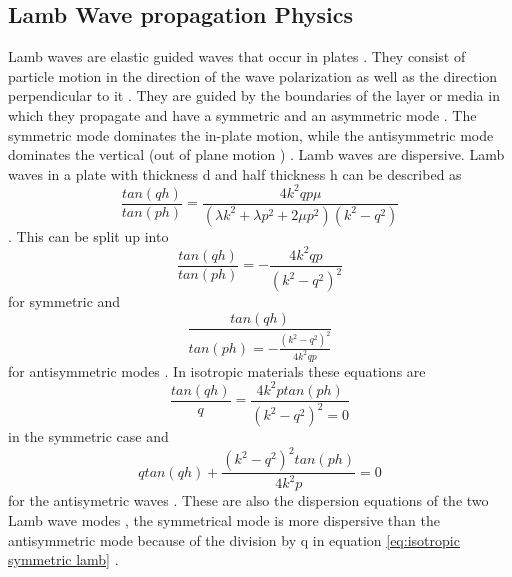 \documentclass[10pt]{article}
\begin{document}
\subsection{Lamb Wave propagation Physics}
Lamb waves are elastic guided waves that occur in plates \parencite{suFundamentalsAnalysisLamb2009}. They consist of particle motion in the direction of the wave polarization as well as the direction perpendicular to it \parencite{suFundamentalsAnalysisLamb2009}. They are guided by the boundaries of the layer or media in which they propagate and have a symmetric and an asymmetric mode \parencite{suFundamentalsAnalysisLamb2009}. The symmetric mode dominates the in-plate motion, while the antisymmetric mode dominates the vertical (out of plane motion ) \parencite{suFundamentalsAnalysisLamb2009}. Lamb waves are dispersive. Lamb waves in a plate with thickness d and half thickness h can be described as \begin{equation}
  \frac{tan(qh)}{tan(ph)} = \frac{4k^2qp\mu}{(\lambda k^2 + \lambda p^2 + 2\mu p^2)(k^2-q^2)}
  \label{eq:lamb wave}
\end{equation} \parencite{suFundamentalsAnalysisLamb2009}. This can be split up into \begin{equation}
  \frac{tan(qh)}{tan(ph)} = -\frac{4k^2qp}{(k^2-q^2)^2}
  \label{eq:lamb symmetric}
\end{equation} for symmetric and \begin{equation}
  \frac{tan(qh)}{tan(ph) = -\frac{(k^2-q^2)^2}{4k^2qp}}
  \label{eq:lamb antisymmetric}
\end{equation} for antisymmetric modes \parencite{suFundamentalsAnalysisLamb2009}. In isotropic materials these equations are \begin{equation}
  \frac{tan(qh)}{q} = \frac{4k^2ptan(ph)}{(k^2-q^2)^2 = 0}
  \label{eq:isotropic symmetric lamb}
\end{equation} in the symmetric case and \begin{equation}
  qtan(qh) + \frac{(k^2-q^2)^2 tan(ph)}{4k^2p} = 0
  \label{eq:isotropic asymetric lamb}
\end{equation} for the antisymetric waves \parencite{suFundamentalsAnalysisLamb2009}. These are also the dispersion equations of the two Lamb wave modes , the symmetrical mode is more dispersive than the antisymmetric mode because of the division by q in equation \ref{eq:isotropic symmetric lamb} \parencite{suFundamentalsAnalysisLamb2009}. 
\end{document}
